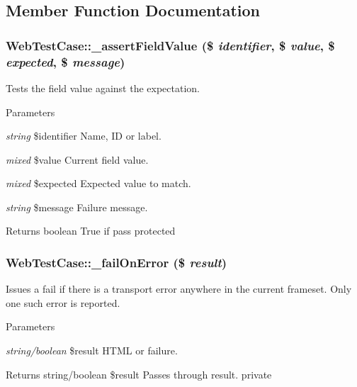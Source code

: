 \subsection{Member Function Documentation}
\hypertarget{class_web_test_case_a4aaf6a1b573b4523fc02800eaf63ba90}{
\subsubsection[{\_\-assertFieldValue}]{\setlength{\rightskip}{0pt plus 5cm}WebTestCase::\_\-assertFieldValue (\$ {\em identifier}, \/  \$ {\em value}, \/  \$ {\em expected}, \/  \$ {\em message})}}
\label{class_web_test_case_a4aaf6a1b573b4523fc02800eaf63ba90}
Tests the field value against the expectation. 
\begin{DoxyParams}{Parameters}
\item[{\em string}]\$identifier Name, ID or label. \item[{\em mixed}]\$value Current field value. \item[{\em mixed}]\$expected Expected value to match. \item[{\em string}]\$message Failure message. \end{DoxyParams}
\begin{DoxyReturn}{Returns}
boolean True if pass  protected 
\end{DoxyReturn}
\hypertarget{class_web_test_case_aa1a77c000c079da166026abda36dffc5}{
\subsubsection[{\_\-failOnError}]{\setlength{\rightskip}{0pt plus 5cm}WebTestCase::\_\-failOnError (\$ {\em result})}}
\label{class_web_test_case_aa1a77c000c079da166026abda36dffc5}
Issues a fail if there is a transport error anywhere in the current frameset. Only one such error is reported. 
\begin{DoxyParams}{Parameters}
\item[{\em string/boolean}]\$result HTML or failure. \end{DoxyParams}
\begin{DoxyReturn}{Returns}
string/boolean \$result Passes through result.  private 
\end{DoxyReturn}
